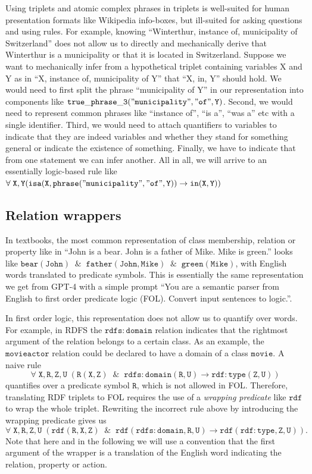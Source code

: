 \documentclass[runningheads]{llncs}
\begin{document}
Using triplets and atomic complex phrases in triplets is well-suited for human presentation formats like Wikipedia info-boxes,
but ill-suited for asking questions and using rules. For example, knowing ``Winterthur, instance of, municipality of Switzerland''
does not allow us to directly and mechanically derive that Winterthur is a municipality or that it is located in Switzerland. Suppose we want
to mechanically infer from a hypothetical triplet containing variables X and Y as in ``X, instance of, municipality of Y'' that ``X, in, Y''
should hold. We would need to first split the phrase ``municipality of Y'' in our representation 
into components like $\mathtt{true\_phrase\_3("municipality","of",Y)}$. Second, we would need to represent common phrases like
``instance of'', ``is a'', ``was a'' etc with a single identifier. Third, we would need to attach quantifiers to variables
to indicate that they are indeed variables and whether they stand for something general or indicate the existence 
of something. Finally, we have to indicate that from one statement we can infer another. 
All in all, we will arrive to an essentially logic-based rule like 
$\mathtt{\forall \; X,Y (isa(X,phrase("municipality","of",Y)) \rightarrow in(X,Y))}$


\subsection{Relation wrappers}

In textbooks, the most common representation of class membership, relation or property like in ``John is a bear. John is a father of Mike. Mike is green.'' 
looks like $\mathtt{bear(John) \; \; \&  \; \; father(John,Mike) \; \; \& \; \; green(Mike)}$, with English words translated to predicate
symbols. This is essentially the same representation we get
from GPT-4 with a simple prompt ``You are a semantic parser from English to first order predicate logic (FOL). Convert input sentences to logic.''.

In first order logic, this representation does not allow us to quantify over words.
For example, in RDFS \cite{manola2004rdf} the $\mathtt{rdfs{\colon}\! domain}$ relation indicates that the rightmost argument
of the relation belongs to a certain class. As an example, the $\mathtt{movieactor}$ relation could
be declared to have a domain of a class $\mathtt{movie}$. A naive rule 
$$\mathtt{\forall \; X,R,Z,U \; (R(X,Z) \; \; \& \; \;  rdfs{\colon}\! domain(R,U)  \rightarrow  rdf{\colon}\! type(Z,U))}$$
quantifies over a predicate symbol $\mathtt{R}$, which is not allowed in FOL.
Therefore, translating RDF triplets to FOL requires the use of a {\em wrapping predicate} like $\mathtt{rdf}$ to wrap the
whole triplet. Rewriting the incorrect rule above by introducing the wrapping predicate gives us
$$\mathtt{\forall \; X,R,Z,U \;(rdf(R,X,Z) \; \;  \& \; \;  rdf(rdfs{\colon}\! domain,R,U)  \rightarrow  rdf(rdf{\colon}\! type,Z,U))}.$$
Note that here and in the following
we will use a convention that the first argument of the wrapper is a translation of the English word indicating the relation, property or action.
\end{document}
